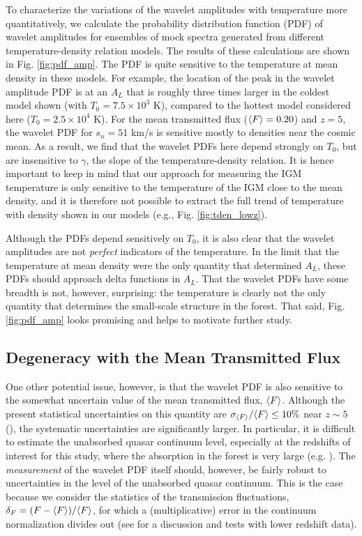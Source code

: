 To characterize the variations of the wavelet amplitudes with temperature more quantitatively, we calculate the probability distribution function (PDF) of wavelet amplitudes for ensembles
of mock spectra generated from different temperature-density relation models. The results of these calculations are shown
in Fig. \ref{fig:pdf_amp}.
The PDF is quite sensitive to the temperature
at mean density in these models. For example, the location of the peak in the wavelet amplitude PDF is at an $A_L$ that is roughly
three times larger in the coldest model shown (with $T_0 = 7.5 \times 10^3$ K), compared to the hottest model considered here
($T_0 = 2.5 \times 10^4$ K). 
For the mean transmitted flux ($\langle F \rangle=0.20$) and $z=5$, the wavelet PDF for $s_n=51$ km/s is
sensitive mostly to densities near the cosmic mean. As a result, we find that the wavelet PDFs here depend strongly on
$T_0$, but are insensitive to $\gamma$, the slope of the temperature-density relation. It is hence important to keep in mind that our approach
for measuring the IGM temperature is only sensitive to the temperature of the IGM close to the mean density, and it is therefore not possible
to extract
the full trend of temperature with density shown in our models (e.g., Fig. \ref{fig:tden_lowz}).

Although the PDFs depend sensitively
on $T_0$, it is also clear that the wavelet amplitudes are not {\em perfect} indicators of the temperature. In the limit
that the temperature at mean density were the only quantity that determined $A_L$, these PDFs should approach delta functions
in $A_L$.
That the wavelet PDFs have some breadth is not, however, surprising: the temperature is clearly not the only quantity that
determines the small-scale structure in the forest. That said, Fig. \ref{fig:pdf_amp} looks promising and helps to motivate
further study.


\subsection{Degeneracy with the Mean Transmitted Flux}
\label{sec:degen_amf}

One other potential issue, however, is that the wavelet PDF is also sensitive to the somewhat uncertain value of the mean transmitted 
flux, $\langle F \rangle$. Although the present statistical uncertainties on this quantity are $\sigma_{\langle F \rangle}/\langle F \rangle \leq 10\%$ near $z \sim 5$ (\citealt{Becker:2012aq}), the systematic uncertainties are significantly larger. In particular, it is difficult
to estimate the unabsorbed quasar continuum level, especially at the redshifts of interest for this study, where the
absorption in the forest is very large (e.g. \citealt{2008ApJ...681..831F}). The {\em measurement} of the wavelet PDF itself should, however,
be fairly robust to uncertainties in the level of the unabsorbed quasar continuum. This is the case because we consider the statistics
of the transmission fluctuations, $\delta_F = (F - \langle F \rangle)/\langle F \rangle$, for which a (multiplicative) error in the continuum normalization
divides out (see \citet{Lidz:2009ca} for a discussion and tests with lower redshift data).


